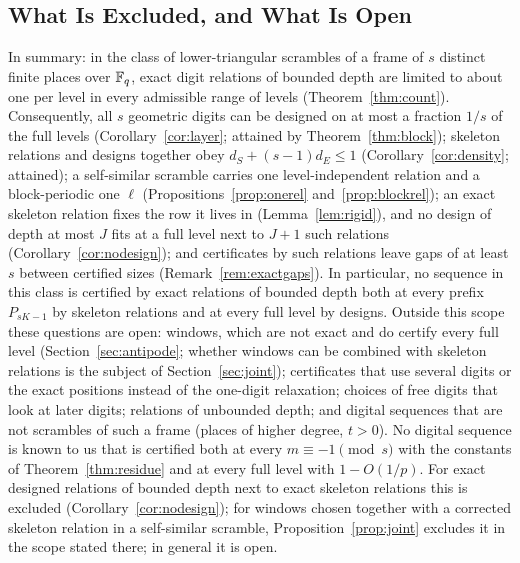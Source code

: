 \subsection{What Is Excluded, and What Is Open}\label{sec:countsummary}
In summary: in the class of lower-triangular scrambles of a frame of $s$ distinct finite places over $\mathbb{F}_q$, exact digit relations of bounded depth are limited to about one per level in every admissible range of levels (Theorem~\ref{thm:count}). Consequently, all $s$ geometric digits can be designed on at most a fraction $1/s$ of the full levels (Corollary~\ref{cor:layer}; attained by Theorem~\ref{thm:block}); skeleton relations and designs together obey $d_S+(s-1)d_E\le1$ (Corollary~\ref{cor:density}; attained); a self-similar scramble carries one level-independent relation and a block-periodic one $\ell$ (Propositions~\ref{prop:onerel} and~\ref{prop:blockrel}); an exact skeleton relation fixes the row it lives in (Lemma~\ref{lem:rigid}), and no design of depth at most $J$ fits at a full level next to $J+1$ such relations (Corollary~\ref{cor:nodesign}); and certificates by such relations leave gaps of at least $s$ between certified sizes (Remark~\ref{rem:exactgaps}). In particular, no sequence in this class is certified by exact relations of bounded depth both at every prefix $P_{sK-1}$ by skeleton relations and at every full level by designs. Outside this scope these questions are open: windows, which are not exact and do certify every full level (Section~\ref{sec:antipode}; whether windows can be combined with skeleton relations is the subject of Section~\ref{sec:joint}); certificates that use several digits or the exact positions instead of the one-digit relaxation; choices of free digits that look at later digits; relations of unbounded depth; and digital sequences that are not scrambles of such a frame (places of higher degree, $t>0$). No digital sequence is known to us that is certified both at every $m\equiv-1\pmod s$ with the constants of Theorem~\ref{thm:residue} and at every full level with $1-O(1/p)$. For exact designed relations of bounded depth next to exact skeleton relations this is excluded (Corollary~\ref{cor:nodesign}); for windows chosen together with a corrected skeleton relation in a self-similar scramble, Proposition~\ref{prop:joint} excludes it in the scope stated there; in general it is open.
